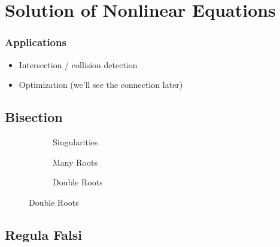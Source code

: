     \chapter{Solution of Nonlinear Equations}
    
    \subsection*{Applications}
    \begin{itemize}
        \item Intersection / collision detection
        \item Optimization (we'll see the connection later)
    \end{itemize}
    
    \section{Bisection}
    \begin{figure}
      \centering
      \begin{subfigure}[b]{0.3\textwidth}
        \resizebox{\textwidth}{!}{
          
        }
        \caption{Singularities}
      \end{subfigure}
      \begin{subfigure}[b]{0.3\textwidth}
        \resizebox{\textwidth}{!}{
          
        }
        \caption{Many Roots}
      \end{subfigure}
      \begin{subfigure}[b]{0.3\textwidth}
        \resizebox{\textwidth}{!}{
          
        }
        \caption{Double Roots}
      \end{subfigure}
      \label{fig:difficult-root-finding}
    \end{figure}

    \begin{figure}
      \centering
      
      \label{fig:bisection_example}
    \end{figure}

    
    \section{Regula Falsi}
    \begin{figure}
      \centering
      
    \end{figure}
    \begin{figure}
      \centering
      
    \end{figure}
    \begin{figure}
      \centering
      
    \end{figure}
    
